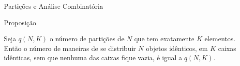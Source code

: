 \begin{frame}[fragile]{Partições e Análise Combinatória}

    \begin{block}{Proposição}

        Seja $q(N, K)$ o número de partições de $N$ que tem exatamente $K$ elementos. Então o 
        número de maneiras de se distribuir $N$ objetos idênticos, em $K$ caixas idênticas, sem que
        nenhuma das caixas fique vazia, é igual a $q(N, K)$.
    \end{block}

\end{frame}


